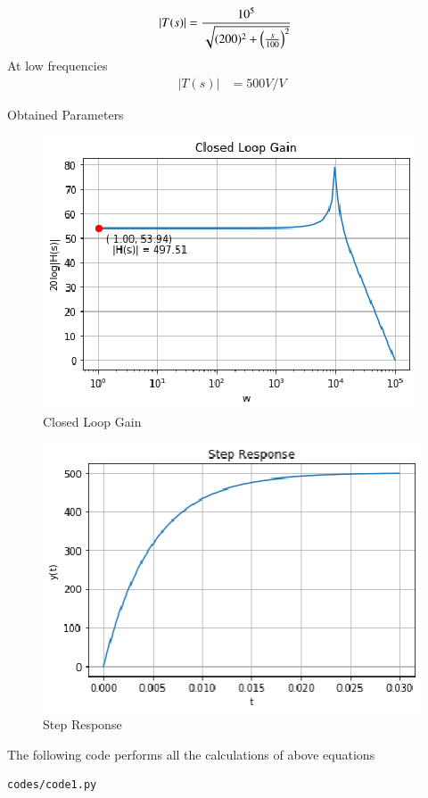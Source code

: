 \begin{enumerate}[label=\thesection.\arabic*.,ref=\thesection.\theenumi]
\begin{align}
|T(s)| &= \dfrac{10^{5}}{\sqrt{(200)^{2} + \left(\frac{s}{100}\right)^{2}}}
\end{align}
At low frequencies
\begin{align}
|T(s)| &= 500 V/V
\end{align}

\begin{table}[!ht]
\centering

\caption{Obtained Parameters}
\label{table:Calculated_params}
\end{table}


\begin{figure}[!ht]
\centering
    \includegraphics[width=\columnwidth]{./figs/Figure_2.eps}
  \caption{Closed Loop Gain}
  \label{fig:ClosedLoopGain}
\end{figure}

\begin{figure}[!ht]
\centering
    \includegraphics[width=\columnwidth]{./figs/Figure_3.eps}
  \caption{Step Response}
  \label{fig:stepResponse}
\end{figure}
The following code performs all the calculations of above equations
\begin{lstlisting}
codes/code1.py
\end{lstlisting}


\end{enumerate}

